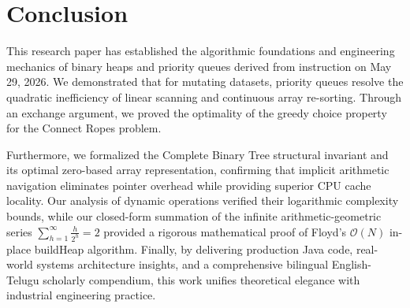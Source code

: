\documentclass[10pt,twocolumn,letterpaper]{article}
\begin{document}
\section{Conclusion}
\label{sec:conclusion}

This research paper has established the algorithmic foundations and engineering mechanics of binary heaps and priority queues derived from instruction on May 29, 2026. We demonstrated that for mutating datasets, priority queues resolve the quadratic inefficiency of linear scanning and continuous array re-sorting. Through an exchange argument, we proved the optimality of the greedy choice property for the Connect Ropes problem. 

Furthermore, we formalized the Complete Binary Tree structural invariant and its optimal zero-based array representation, confirming that implicit arithmetic navigation eliminates pointer overhead while providing superior CPU cache locality. Our analysis of dynamic operations verified their logarithmic complexity bounds, while our closed-form summation of the infinite arithmetic-geometric series $\sum_{h=1}^\infty \frac{h}{2^h} = 2$ provided a rigorous mathematical proof of Floyd's $\mathcal{O}(N)$ in-place buildHeap algorithm. Finally, by delivering production Java code, real-world systems architecture insights, and a comprehensive bilingual English-Telugu scholarly compendium, this work unifies theoretical elegance with industrial engineering practice.

\end{document}
